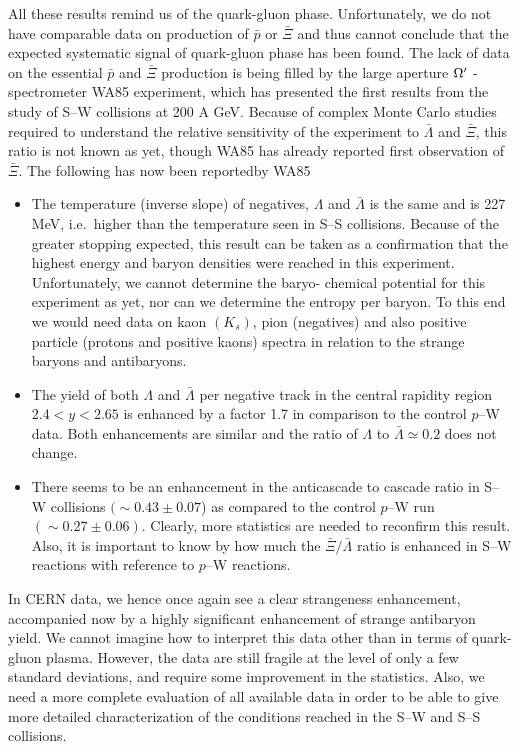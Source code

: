 \begin{mdframed}[linecolor=gray,roundcorner=12pt,backgroundcolor=Dandelion!15,linewidth=1pt,leftmargin=0cm,rightmargin=0cm,topline=true,bottomline=true,skipabove=12pt]
All these results remind us of the quark-gluon phase. Unfortunately, we do not have comparable data on production of $\bar p$ or ${\bar\Xi}$ and thus cannot conclude that the expected systematic signal of quark-gluon phase has been found. The lack of data on the essential $\bar p$ and ${\bar \Xi}$ production is being filled by the large aperture $\Omega\rq\ $-spectrometer WA85 experiment, which has presented the first results from the study of S--W collisions at 200 A GeV. Because of complex Monte Carlo studies required to understand the relative sensitivity of the experiment to ${\bar\Lambda}$ and ${\bar\Xi}$, this ratio is not known as yet, though WA85 has already reported first observation of $\bar \Xi$. The following has now been reported\footnotemark[28,29,30] by WA85 
\begin{itemize}
%
\item The temperature (inverse slope) of negatives, $\Lambda$ and ${\bar\Lambda}$ is the same and is 227 MeV, i.e.~higher than the temperature seen in S--S collisions. Because of the greater stopping expected, this result can be taken as a confirmation that the highest energy and baryon densities were reached in this experiment. Unfortunately, we cannot determine the baryo- chemical potential for this experiment as yet, nor can we determine the entropy per baryon. To this end we would need data on kaon $(K_s)$, pion (negatives) and also positive particle (protons and positive kaons) spectra in relation to the strange baryons and antibaryons.
%
\item The yield of both $\Lambda$ and ${\bar\Lambda}$ per negative track in the central rapidity region $2.4 < y < 2.65 $ is enhanced by a factor 1.7 in comparison to the control $p$--W data. Both enhancements are similar and the ratio of $\Lambda$ to ${\bar\Lambda} \simeq 0.2$ does not change. 
%
\item There seems to be an enhancement in the anticascade to cascade ratio in S--W collisions $(\sim 0.43 \pm 0.07$) as compared to the control $p$--W run $(\sim 0.27 \pm 0.06)$. Clearly, more statistics are needed to reconfirm this result. Also, it is important to know by how much the $\bar\Xi/\bar\Lambda$ ratio is enhanced in S--W reactions with reference to $p$--W reactions.
\end{itemize}

In CERN data, we hence once again see a clear strangeness enhancement, accompanied now by a highly significant enhancement of strange antibaryon yield. We cannot imagine how to interpret this data other than in terms of quark-gluon plasma. However, the data are still fragile at the level of only a few standard deviations, and require some improvement in the statistics. Also, we need a more complete evaluation of all available data in order to be able to give more detailed characterization of the conditions reached in the S--W and S--S collisions.  



\end{mdframed}
